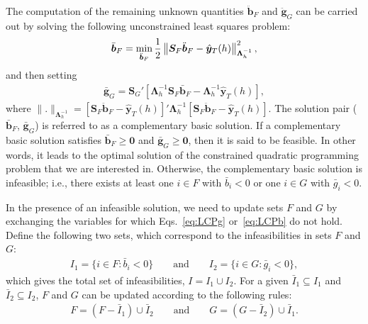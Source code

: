 \documentclass[11pt]{article}
\newcommand{\0}{\phantom{0}}
\begin{document}
The computation of the remaining unknown quantities $\ddot{\bm{b}}_{F}$ and $\ddot{\bm{g}}_{G}$ can be carried out by solving the following unconstrained least squares problem:
\begin{align}
\label{eq:basicquad}
\bar{\bm{b}}_{F} = \operatornamewithlimits{min}_{\ddot{\bm{b}}_{F}} \frac{1}{2}\left\|\bm{S}_{F}\ddot{\bm{b}}_{F} - \hat{\bm{y}}_{T}(h)\right\|^{2}_{\bm{\Lambda}_{h}^{-1}},
\end{align}
and then setting
\begin{align}
\label{eq:basicgrad}
\bar{\bm{g}}_{G} = \bm{S}_{G}'[\bm{\Lambda}_{h}^{-1}\bm{S}_{F}\bar{\bm{b}}_{F} - \bm{\Lambda}_{h}^{-1}\hat{\bm{y}}_{T}(h)],
\end{align}
where $\|.\|_{\bm{\Lambda}_{h}^{-1}} = [\bm{S}_{F}\ddot{\bm{b}}_{F} - \hat{\bm{y}}_{T}(h)]'\bm{\Lambda}_{h}^{-1} [\bm{S}_{F}\ddot{\bm{b}}_{F} - \hat{\bm{y}}_{T}(h)]$. The solution pair ($\bar{\bm{b}}_{F}$, $\bar{\bm{g}}_{G}$) is referred to as a complementary basic solution. If a complementary basic solution satisfies $\bar{\bm{b}}_{F} \geq \bm{0}$ and $\bar{\bm{g}}_{G} \geq \bm{0}$, then it is said to be feasible. In other words, it leads to the optimal solution of the constrained quadratic programming problem that we are interested in. Otherwise, the complementary basic solution is infeasible; i.e., there exists at least one $i \in F$ with $\bar{b}_{i} < 0$ or one $i \in G$ with $\bar{g}_{i} < 0$.

In the presence of an infeasible solution, we need to update sets $F$ and $G$ by exchanging the variables for which Eqs.~\eqref{eq:LCPg} or~\eqref{eq:LCPb} do not hold. Define the following two sets, which correspond to the infeasibilities in sets $F$ and $G$:
\begin{align}
\label{eq:indexset}
I_{1} = \{i \in F: \bar{b}_{i} < 0\} \qquad \text{and} \qquad I_{2} = \{i \in G: \bar{g}_{i} < 0\},
\end{align}
which gives the total set of infeasibilities, $I = I_{1} \cup I_{2}$. For a given $\bar{I}_{1} \subseteq I_{1}$ and $\bar{I}_{2} \subseteq I_{2}$, $F$ and $G$ can be updated according to the following rules:
\begin{align}
\label{eq:indexsetrev}
F = (F - \bar{I}_{1}) \cup \bar{I}_{2} \qquad \text{and} \qquad G = (G - \bar{I}_{2}) \cup \bar{I}_{1}.
\end{align}
\end{document}
